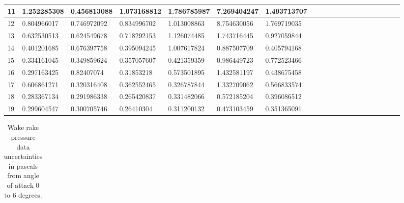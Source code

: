 \documentclass[11pt, letterpaper]{article}
\begin{document}
\begin{appendices}
\begin{table}[!ht]
\begin{tabular}{|l|l|l|l|l|l|l|l|l|l|l|l|l|l|l|l|l|l|l|l|}
        11 & 1.252285308 & 0.456813088 & 1.073168812 & 1.786785987 & 7.269404247 & 1.493713707  \\ \hline
        12 & 0.804966017 & 0.746972092 & 0.834996702 & 1.013008863 & 8.754630056 & 1.769719035  \\ \hline
        13 & 0.632530513 & 0.624549678 & 0.718292153 & 1.126074485 & 1.743716445 & 0.927059844  \\ \hline
        14 & 0.401201685 & 0.676397758 & 0.395094245 & 1.007617824 & 0.887507709 & 0.405794168  \\ \hline
        15 & 0.334161045 & 0.349859624 & 0.357057607 & 0.421359359 & 0.986449723 & 0.772523466  \\ \hline
        16 & 0.297163425 & 0.82407074 & 0.31853218 & 0.573501895 & 1.432581197 & 0.438675458  \\ \hline
        17 & 0.606861271 & 0.320316408 & 0.362552465 & 0.326787844 & 1.332709062 & 0.566833574  \\ \hline
        18 & 0.283367134 & 0.291986338 & 0.265420837 & 0.331482066 & 0.572185204 & 0.396086512  \\ \hline
        19 & 0.299604547 & 0.300705746 & 0.26410304 & 0.311200132 & 0.473103459 & 0.351365091  \\ \hline
    \end{tabular}
\end{table}

\begin{table}[!ht]
    \centering
    \caption{Wake rake pressure data uncertainties in pascals from angle of attack 0 to 6 degrees.}
    \begin{tabular}{|l|l|l|l|l|l|}
    

\end{tabular}
\end{table}
\end{appendices}
\end{document}
